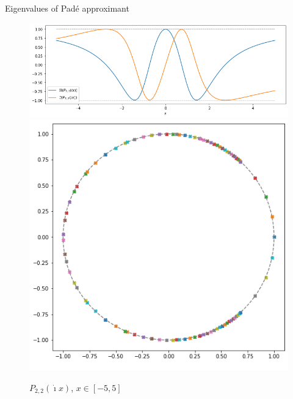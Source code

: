 \documentclass{beamer}
\newcommand{\I}{\dot{\imath}}
\begin{document}
\begin{frame}{Eigenvalues of Padé approximant}
  \begin{figure}\centering
   \includegraphics[height=0.35\textheight]{img/P22_reim}
   \includegraphics[height=0.35\textheight]{img/P22_ev}
   \caption{$P_{2,2}(\I x)$, $x\in[-5,5]$}
 \end{figure}
\end{frame}
\end{document}
